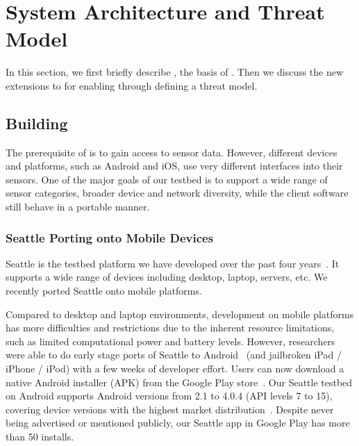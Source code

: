 \section{System Architecture and Threat Model}

In this section, we first briefly describe \sensorname, the basis of \blurname.
Then we discuss the new extensions to \sensorname for enabling \blurname through
defining a threat model.

\subsection{Building \sensorname}

The prerequisite of \blurname is to gain access to sensor data. However,
different devices and platforms, such as Android and iOS, use very different
interfaces into their sensors. One of the major goals of our testbed is to
support a wide range of sensor categories, broader device and network diversity,
while the client software still behave in a portable manner.  

\subsubsection{Seattle Porting onto Mobile Devices}\label{sec-portability}
Seattle is the testbed platform we have developed over the past four
years~\cite{Seattlewebpage}. It supports a wide range of devices including
desktop, laptop, servers, etc. We recently ported Seattle onto mobile platforms.

Compared to desktop and laptop environments, development on mobile platforms has
more difficulties and restrictions due to the inherent resource limitations,
such as limited computational power and battery levels. 
However, researchers were able to do early stage ports 
of Seattle to Android~\cite{seattleonandroid} (and jailbroken iPad / iPhone / 
iPod) with a few weeks of developer effort. Users can now download a 
native Android installer (APK) from the Google Play 
store~\cite{seattle-android}. Our Seattle testbed on Android supports Android 
versions from 2.1 to 4.0.4 (API levels 7 to 15), covering device versions with 
the highest market distribution~\cite{dashboard-android}.   
Despite never being advertised or mentioned publicly, our Seattle 
app in Google Play has more than 50 installs.   

